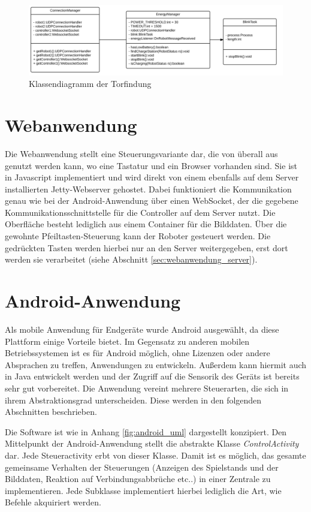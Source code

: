 \begin{figure}[!h]
	\includegraphics[width=\textwidth]{images/uml_energymanager.pdf}
	\caption{Klassendiagramm der Torfindung}
	\label{fig:uml_energymanager}
\end{figure}




\section{Webanwendung}
\label{sec:webanwendung_anwendung}

Die Webanwendung stellt eine Steuerungsvariante dar, die von überall aus genutzt werden kann, wo eine Tastatur und ein Browser vorhanden sind. Sie ist in Javascript implementiert und wird direkt von einem ebenfalls auf dem Server installierten Jetty-Webserver gehostet. Dabei funktioniert die Kommunikation genau wie bei der Android-Anwendung über einen WebSocket, der die gegebene Kommunikationsschnittstelle für die Controller auf dem Server nutzt. 
Die Oberfläche besteht lediglich aus einem Container für die Bilddaten. 
Über die gewohnte Pfeiltasten-Steuerung kann der Roboter gesteuert werden. Die gedrückten Tasten werden hierbei nur an den Server weitergegeben, erst dort werden sie verarbeitet (siehe Abschnitt \ref{sec:webanwendung_server}).

\section{Android-Anwendung}
Als mobile Anwendung für Endgeräte wurde Android ausgewählt, da diese Plattform einige Vorteile bietet. Im Gegensatz zu anderen mobilen Betriebssystemen ist es für Android möglich, ohne Lizenzen oder andere Absprachen zu treffen, Anwendungen zu entwickeln. Außerdem kann hiermit auch in Java entwickelt werden und der Zugriff auf die Sensorik des Geräts ist bereits sehr gut vorbereitet. 
Die Anwendung vereint mehrere Steuerarten, die sich in ihrem Abstraktionsgrad unterscheiden. Diese werden in den folgenden Abschnitten beschrieben.

Die Software ist wie in Anhang \ref{fig:android_uml} dargestellt konzipiert. Den Mittelpunkt der Android-Anwendung stellt die abstrakte Klasse \textit{ControlActivity} dar. Jede Steueractivity erbt von dieser Klasse. Damit ist es möglich, das gesamte gemeinsame Verhalten der Steuerungen (Anzeigen des Spielstands und der Bilddaten, Reaktion auf Verbindungsabbrüche etc..) in einer Zentrale zu implementieren. Jede Subklasse implementiert hierbei lediglich die Art, wie Befehle akquiriert werden. 

